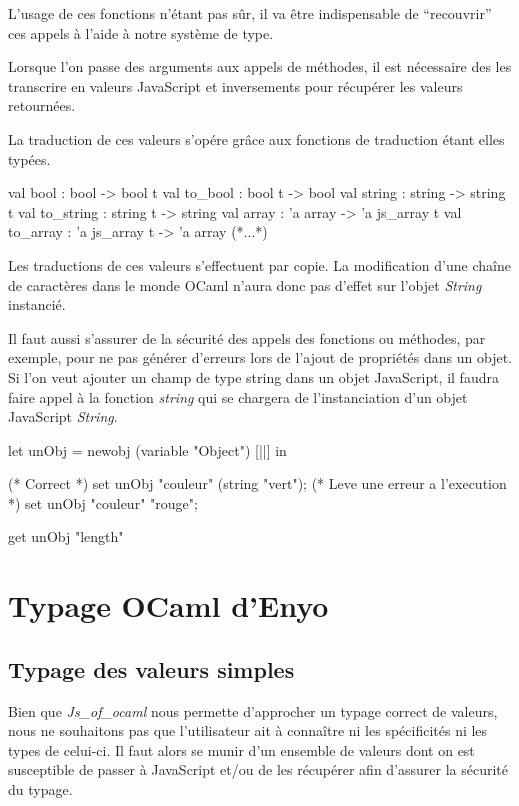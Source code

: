 \documentclass[11pt,a4paper]{report}
\begin{document}
L'usage de ces fonctions n'étant pas sûr, il va être indispensable de ``recouvrir'' ces appels
à l'aide à notre système de type.

Lorsque l'on passe des arguments aux appels de méthodes, il est nécessaire des les transcrire
en valeurs JavaScript et inversements pour récupérer les valeurs retournées.

La traduction de ces valeurs s'opére grâce aux fonctions de traduction étant elles typées.
\begin{OCaml}
  val bool : bool -> bool t
  val to_bool : bool t -> bool
  val string : string -> string t
  val to_string : string t -> string
  val array : 'a array -> 'a js_array t
  val to_array : 'a js_array t -> 'a array
  (*...*)
\end{OCaml}

Les traductions de ces valeurs s'effectuent par copie. La modification d'une chaîne de
caractères dans le monde OCaml n'aura donc pas d'effet sur l'objet \emph{String} instancié.

Il faut aussi s'assurer de la sécurité des appels des fonctions ou méthodes, par exemple,
pour ne pas générer d'erreurs lors de l'ajout de propriétés dans un objet. Si l'on veut ajouter 
un champ de type string dans un objet JavaScript, il faudra faire appel à la fonction 
\emph{string} qui se chargera de l'instanciation d'un objet JavaScript \emph{String}.

\begin{OCaml}
  let unObj = newobj (variable "Object") [||] in

  (* Correct *)
  set unObj "couleur" (string "vert");
  (* Leve une erreur a l'execution *)
  set unObj "couleur" "rouge";

  get unObj "length"
\end{OCaml}

\section{Typage OCaml d'Enyo}
\subsection{Typage des valeurs simples}

Bien que \emph{Js\_of\_ocaml} nous permette d'approcher un typage correct de valeurs, nous ne souhaitons pas
que l'utilisateur ait à connaître ni les spécificités ni les types de celui-ci.
Il faut alors se munir d'un ensemble de valeurs dont on est susceptible de passer à JavaScript
et/ou de les récupérer afin d'assurer la sécurité du typage.
\end{document}
